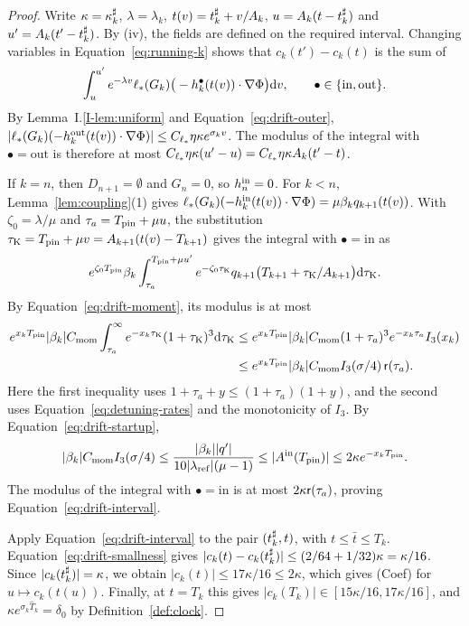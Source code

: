 \begin{proof}
Write $\kappa=\kappa^\sharp_k$, $\lambda=\lambda_k$, $t(v)=t^\sharp_k+v/A_k$,
$u=A_k(t-t^\sharp_k)$ and $u'=A_k(t'-t^\sharp_k)$. By (iv), the fields are defined
on the required interval. Changing variables in Equation~\eqref{eq:running-k}
shows that $c_k(t')-c_k(t)$ is the sum of
\[
\int_u^{u'}e^{-\lambda v}\ell_*(G_k)
\big(-h^\bullet_k(t(v))\cdot\nabla\Phi\big)\dd v,
\qquad \bullet\in\{\mathrm{in},\mathrm{out}\}.
\]
By Lemma~I.\ref{I-lem:uniform} and Equation~\eqref{eq:drift-outer},
$|\ell_*(G_k)(-h^{\mathrm{out}}_k(t(v))\cdot\nabla\Phi)|
\le C_{\ell_*}\eta\kappa e^{\sigma_kv}$.
The modulus of the integral with $\bullet=\mathrm{out}$ is therefore at most
$C_{\ell_*}\eta\kappa(u'-u)=C_{\ell_*}\eta\kappa A_k(t'-t)$.

If $k=n$, then $D_{n+1}=\emptyset$ and $G_n=0$, so $h^{\mathrm{in}}_n=0$.
For $k<n$, Lemma~\ref{lem:coupling}\textup{(1)} gives
$\ell_*(G_k)(-h^{\mathrm{in}}_k(t(v))\cdot\nabla\Phi)=\mu\beta_kq_{k+1}(t(v))$.
With $\zeta_0=\lambda/\mu$ and $\tau_a=T_{\mathrm{pin}}+\mu u$, the substitution
$\tau_{\mathrm{K}}=T_{\mathrm{pin}}+\mu v=A_{k+1}(t(v)-T_{k+1})$ gives the integral with
$\bullet=\mathrm{in}$ as
\[
e^{\zeta_0T_{\mathrm{pin}}}\beta_k\int_{\tau_a}^{T_{\mathrm{pin}}+\mu u'}
e^{-\zeta_0\tau_{\mathrm{K}}}q_{k+1}\big(T_{k+1}+\tau_{\mathrm{K}}/A_{k+1}\big)\dd\tau_{\mathrm{K}}.
\]
By Equation~\eqref{eq:drift-moment}, its modulus is at most
\begin{align*}
e^{x_kT_{\mathrm{pin}}}|\beta_k|C_{\mathrm{mom}}\int_{\tau_a}^\infty e^{-x_k\tau_{\mathrm{K}}}(1+\tau_{\mathrm{K}})^3\dd\tau_{\mathrm{K}}
&\le e^{x_kT_{\mathrm{pin}}}|\beta_k|C_{\mathrm{mom}}(1+\tau_a)^3e^{-x_k\tau_a}I_{3}(x_k)\\
&\le e^{x_kT_{\mathrm{pin}}}|\beta_k|C_{\mathrm{mom}}I_{3}(\sigma/4)\,\mathsf{r}(\tau_a).
\end{align*}
Here the first inequality uses $1+\tau_a+y\le(1+\tau_a)(1+y)$, and the second
uses Equation~\eqref{eq:detuning-rates} and the monotonicity of $I_3$.
By Equation~\eqref{eq:drift-startup},
\[
|\beta_k|C_{\mathrm{mom}}I_{3}(\sigma/4)\le\frac{|\beta_k||q'|}{10|\lambda_{\mathrm{ref}}|(\mu-1)}
\le|A^{\mathrm{in}}(T_{\mathrm{pin}})|\le2\kappa e^{-x_kT_{\mathrm{pin}}}.
\]
The modulus of the integral with $\bullet=\mathrm{in}$ is at most $2\kappa\mathsf{r}(\tau_a)$, proving
Equation~\eqref{eq:drift-interval}.

Apply Equation~\eqref{eq:drift-interval} to the pair $(t^\sharp_k,t)$, with $t\le\bar t\le T_k$.
Equation~\eqref{eq:drift-smallness} gives
$|c_k(t)-c_k(t^\sharp_k)|\le(2/64+1/32)\kappa=\kappa/16$.
Since $|c_k(t^\sharp_k)|=\kappa$, we obtain $|c_k(t)|\le17\kappa/16\le2\kappa$,
which gives (Coef) for $u\mapsto c_k(t(u))$.
Finally, at $t=T_k$ this gives
$|c_k(T_k)|\in[15\kappa/16,17\kappa/16]$, and
$\kappa e^{\sigma_k\hat T_k}=\delta_0$ by Definition~\ref{def:clock}.
\end{proof}

